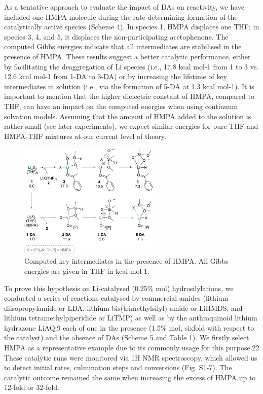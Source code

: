 \documentclass[journal=jacsat,manuscript=article]{achemso}
\begin{document}
	As a tentative approach to evaluate the impact of DAs on	reactivity, we have included one HMPA molecule during the
	rate-determining formation of the catalytically active species (Scheme 4). In species 1, HMPA displaces one THF; in species
	3, 4, and 5, it displaces the non-participating acetophenone. The computed Gibbs energies indicate that all intermediates
	are stabilised in the presence of HMPA. These results suggest a	better catalytic performance, either by facilitating the deaggregation of Li species (i.e., 17.8 kcal mol-1 from 1 to 3 vs. 12.6 kcal mol-1 from 1-DA to 3-DA) or by increasing the lifetime of key intermediates in solution (i.e., via the formation of 5-DA at 1.3 kcal mol-1). It is important to mention that the higher dielectric constant of HMPA, compared to THF, can have an impact on the computed energies when using continuum solvation models. Assuming that the amount of HMPA added to the solution is rather small (see later experiments),
	we expect similar energies for pure THF and HMPA-THF mixtures at our current level of theory.

	\begin{figure}[H]
	\includegraphics[width=0.6\textwidth]{figures/CompHMPA.PNG}		
	\centering
	\caption{Computed key intermediates in the presence of HMPA. All Gibbs energies are given in THF in kcal mol-1.}
	\label{Scheme4}
	\end{figure}

	To prove this hypothesis on Li-catalysed (0.25\% mol) hydrosilylations, we conducted a series of reactions catalysed by
	commercial amides (lithium diisopropylamide or LDA, lithium bis(trimethylsilyl) amide or LiHMDS, and lithium tetramethylpiperidide or LiTMP) as well as by the anthraquinoid lithium	hydrazone LiAQ,9 each of one in the presence (1.5\% mol, sixfold with respect to the catalyst) and the absence of DAs (Scheme 5 and Table 1). We firstly select HMPA as a representative example due to its commonly usage for this purpose.22 These catalytic runs were monitored via 1H NMR spectroscopy, which allowed us to detect initial rates, culmination steps and conversions (Fig. S1-7). The catalytic outcome remained the same when increasing the excess of HMPA up to 12-fold or 32-fold.
	
\end{document}
